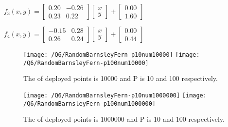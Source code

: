 \documentclass{article}
\begin{document}
    $f_{3}(x, y)=\left[\begin{array}{cc}0.20 & -0.26 \\ 0.23 & 0.22\end{array}\right]\left[\begin{array}{l}x \\ y\end{array}\right]+\left[\begin{array}{l}0.00 \\ 1.60\end{array}\right]$
    
    $f_{4}(x, y)=\left[\begin{array}{cc}-0.15 & 0.28 \\ 0.26 & 0.24\end{array}\right]\left[\begin{array}{l}x \\ y\end{array}\right]+\left[\begin{array}{l}0.00 \\ 0.44\end{array}\right]$

    \begin{figure}[!htb]
        \centering
        \texttt{[image: /Q6/RandomBarnsleyFern-p10num10000]}
        \label{fig:6.1.1}
        \texttt{[image: /Q6/RandomBarnsleyFern-p100num10000]}
        \label{fig:6.1.2}
        \caption{The of deployed points is 10000 and P is 10 and 100 respectively.}
    \end{figure}
    \begin{figure}[!htb]
        \centering
        \texttt{[image: /Q6/RandomBarnsleyFern-p10num1000000]}
        \label{fig:6.2.1}
        \texttt{[image: /Q6/RandomBarnsleyFern-p100num1000000]}
        \label{fig:6.2.2}
        \caption{The of deployed points is 1000000 and P is 10 and 100 respectively.}
    \end{figure}
\end{document}
